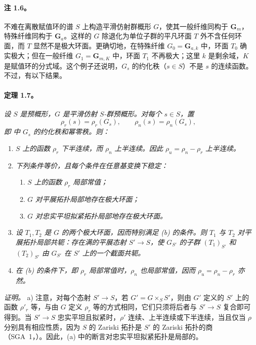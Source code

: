 \paragraph{\textbf{注 1.6。}}
不难在离散赋值环的谱 \(S\) 上构造平滑仿射群概形 \(G\)，使其一般纤维同构于 \(\mathbf G_m\)，特殊纤维同构于 \(\mathbf G_a\)。这样的 \(G\) 除退化为单位子群的平凡环面 \(T\) 外不含任何环面，而 \(T\) 显然不是极大环面。更确切地，在特殊纤维 \(G_0=\mathbf G_{a,k}\) 中，环面 \(T_0\) 确实极大；但在一般纤维 \(G_1=\mathbf G_{m,K}\) 中，环面 \(T_1\) 不再极大；这里 \(k\) 是剩余域，\(K\) 是赋值环的分式域。这个例子还说明，\(G_s\) 的约化秩（\(s\in S\)）不是 \(s\) 的连续函数。不过，有以下结果。
\paragraph{\textbf{定理 1.7。}}
\emph{设 \(S\) 是预概形，\(G\) 是平滑仿射 \(S\)-群预概形。对每个 \(s\in S\)，置
\[
  \rho_r(s)=\rho_r(G_s),\qquad
  \rho_n(s)=\rho_n(G_s),
\]
即  中 \(G_s\) 的约化秩和幂零秩。则：}
\begin{enumerate}
\renewcommand{\labelenumi}{\alph{enumi})}
\item{} \emph{\(S\) 上的函数 \(\rho_r\) 下半连续，而 \(\rho_n\) 上半连续。因此 \(\rho_u=\rho_n-\rho_r\) 上半连续。}
\item{} \emph{下列条件等价，且每个条件在任意基变换下稳定：}
\begin{enumerate}
\renewcommand{\labelenumii}{(\roman{enumii})}
\item \emph{\(S\) 上的函数 \(\rho_r\) 局部常值；}
\item \emph{\(G\) 对平展拓扑局部地存在极大环面；}
\item[\textup{(ii bis)}] \emph{\(G\) 对忠实平坦拟紧拓扑局部地存在极大环面。}
\end{enumerate}
\item \emph{设 \(T_1,T_2\) 是 \(G\) 的两个极大环面，因而特别满足 (b) 的条件。则 \(T_1\) 与 \(T_2\) 对平展拓扑局部共轭：存在满的平展态射 \(S'\to S\)，使 \(G_{S'}\) 的子群 \((T_1)_{S'}\) 和 \((T_2)_{S'}\) 由 \(G_{S'}\) 在 \(S'\) 上的一个截面共轭。}
\item \emph{在 (b) 的条件下，即 \(\rho_r\) 局部常值时，\(\rho_n\) 也局部常值，因而 \(\rho_u=\rho_n-\rho_r\) 亦然。}
\end{enumerate}
\emph{证明。}
a) 注意，对每个态射 \(S'\to S\)，若 \(G'=G\times_S S'\)，则由 \(G'\) 定义的 \(S'\) 上的函数 \(\rho'_r\) 等，与由 \(G\) 定义 \(\rho_r\) 等的方式相同，它们只须将后者与 \(S'\to S\) 复合即可得到。当 \(S'\to S\) 忠实平坦且拟紧时，\(\rho'\) 连续、上半连续或下半连续，当且仅当 \(\rho\) 分别具有相应性质，因为 \(S\) 的 Zariski 拓扑是 \(S'\) 的 Zariski 拓扑的商（SGA~1，）。因此，(a) 中的断言对忠实平坦拟紧拓扑是局部的。
